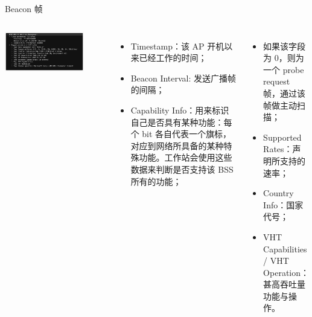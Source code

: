 \documentclass[aspectratio=169]{beamer}
\begin{document}
    \begin{frame}{Beacon 帧}
        \begin{columns}[onlytextwidth]
          \includegraphics[width=0.8\textwidth]{resources/Beacon.png}
            \begin{itemize}
             \item Timestamp：该 AP 开机以来已经⼯作的时间；
             \item Beacon Interval: 发送⼴播帧的间隔；
             \item Capability Info：⽤来标识⾃⼰是否具有某种功能：每个 bit 各⾃代表⼀个旗标，对应到⽹络所具备的某种特殊功能。⼯作站会使⽤这些数据来判断是否⽀持该 BSS 所有的功能；
            \end{itemize}
            \begin{itemize}
              \item 如果该字段为 0，则为⼀个 probe request 帧，通过该帧做主动扫描；
              \item Supported Rates：声明所⽀持的速率；
              \item Country Info：国家代号；
              \item VHT Capabilities / VHT Operation：甚⾼吞吐量功能与操作。
            \end{itemize}
        \end{columns}
        \justifying
    \end{frame}
\end{document}

